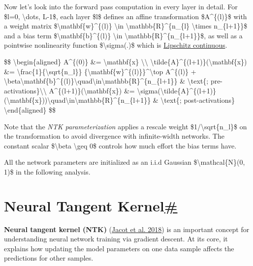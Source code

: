 Now let's look into the forward pass computation in every layer in detail. For \$l=0, \textbackslash dots, L-1\$, each layer \$l\$ defines an affine transformation \$A\^{}\{(l)\}\$ with a weight matrix \$\textbackslash mathbf\{w\}\^{}\{(l)\} \textbackslash in \textbackslash mathbb\{R\}\^{}\{n\_\{l\} \textbackslash times n\_\{l+1\}\}\$ and a bias term \$\textbackslash mathbf\{b\}\^{}\{(l)\} \textbackslash in \textbackslash mathbb\{R\}\^{}\{n\_\{l+1\}\}\$, as well as a pointwise nonlinearity function \$\textbackslash sigma(.)\$ which is \href{https://en.wikipedia.org/wiki/Lipschitz_continuity}{Lipschitz continuous}.

\$\$ \textbackslash begin\{aligned\} A\^{}\{(0)\} \&= \textbackslash mathbf\{x\} \textbackslash\textbackslash{} \textbackslash tilde\{A\}\^{}\{(l+1)\}(\textbackslash mathbf\{x\}) \&= \textbackslash frac\{1\}\{\textbackslash sqrt\{n\_l\}\} \{\textbackslash mathbf\{w\}\^{}\{(l)\}\}\^{}\textbackslash top A\^{}\{(l)\} + \textbackslash beta\textbackslash mathbf\{b\}\^{}\{(l)\}\textbackslash quad\textbackslash in\textbackslash mathbb\{R\}\^{}\{n\_\{l+1\}\} \& \textbackslash text\{; pre-activations\}\textbackslash\textbackslash{} A\^{}\{(l+1)\}(\textbackslash mathbf\{x\}) \&= \textbackslash sigma(\textbackslash tilde\{A\}\^{}\{(l+1)\}(\textbackslash mathbf\{x\}))\textbackslash quad\textbackslash in\textbackslash mathbb\{R\}\^{}\{n\_\{l+1\}\} \& \textbackslash text\{; post-activations\} \textbackslash end\{aligned\} \$\$

Note that the \emph{NTK parameterization} applies a rescale weight \$1/\textbackslash sqrt\{n\_l\}\$ on the transformation to avoid divergence with infinite-width networks. The constant scalar \$\textbackslash beta \textbackslash geq 0\$ controls how much effort the bias terms have.

All the network parameters are initialized as an i.i.d Gaussian \$\textbackslash mathcal\{N\}(0, 1)\$ in the following analysis.

\section{\texorpdfstring{Neural Tangent Kernel\hyperref[neural-tangent-kernel]{\#}}{Neural Tangent Kernel\#}}\label{neural-tangent-kernel}

\textbf{Neural tangent kernel (NTK)} (\href{https://arxiv.org/abs/1806.07572}{Jacot et al. 2018}) is an important concept for understanding neural network training via gradient descent. At its core, it explains how updating the model parameters on one data sample affects the predictions for other samples.


